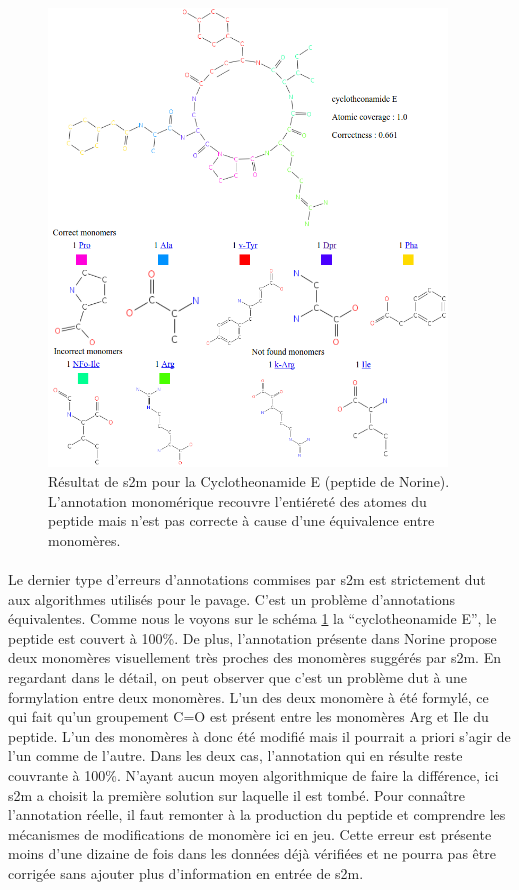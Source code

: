 \documentclass[12pt,french,twoside]{report}
\begin{document}
\begin{figure}[h!]
  \begin{center}
    \includegraphics[width=400px]{Figures/s2m/results/cyclotheonamide.png}
    \caption{\label{cycloth}Résultat de s2m pour la Cyclotheonamide E (peptide de Norine).
    L'annotation monomérique recouvre l'entiéreté des atomes du peptide mais n'est pas correcte à cause d'une équivalence entre monomères.}
  \end{center}
\end{figure}

\paragraph{}Le dernier type d'erreurs d'annotations commises par s2m est strictement dut aux algorithmes utilisés pour le pavage.
C'est un problème d'annotations équivalentes.
Comme nous le voyons sur le schéma \ref{cycloth} la ``cyclotheonamide E'', le peptide est couvert à 100\%.
De plus, l'annotation présente dans Norine propose deux monomères visuellement très proches des monomères suggérés par s2m.
En regardant dans le détail, on peut observer que c'est un problème dut à une formylation entre deux monomères.
L'un des deux monomère à été formylé, ce qui fait qu'un groupement C=O est présent entre les monomères Arg et Ile du peptide.
L'un des monomères à donc été modifié mais il pourrait a priori s'agir de l'un comme de l'autre.
Dans les deux cas, l'annotation qui en résulte reste couvrante à 100\%.
N'ayant aucun moyen algorithmique de faire la différence, ici s2m a choisit la première solution sur laquelle il est tombé.
Pour connaître l'annotation réelle, il faut remonter à la production du peptide et comprendre les mécanismes de modifications de monomère ici en jeu.
Cette erreur est présente moins d'une dizaine de fois dans les données déjà vérifiées et ne pourra pas être corrigée sans ajouter plus d'information en entrée de s2m.
\end{document}
